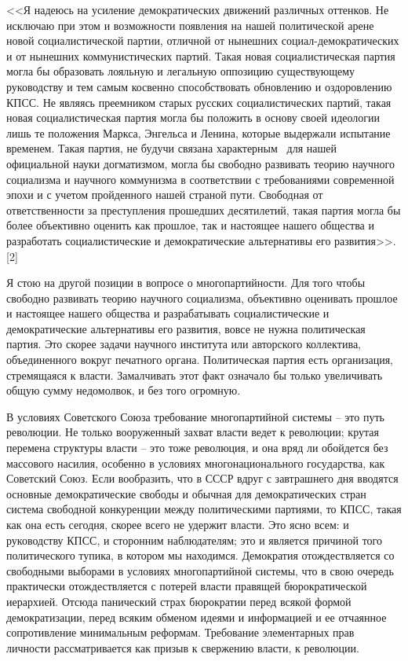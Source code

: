 \documentclass{book}
\begin{document}
<<Я надеюсь на усиление демократических движений различ­ных оттенков. Не исключаю при этом и возможности появле­ния на нашей политической арене новой социалистической пар­тии, отличной от нынешних социал-демократических и от нынеш­них коммунистических партий. Такая новая социалистическая партия могла бы образовать лояльную и легальную оппозицию существующему руководству и тем самым косвенно способ­ствовать обновлению и оздоровлению КПСС. Не являясь преем­ником старых русских социалистических партий, такая новая социалистическая партия могла бы положить в основу своей идеологии лишь те положения Маркса, Энгельса и Ленина, ко­торые выдержали испытание временем. Такая партия, не бу­дучи связана характерным  для нашей официальной науки догматизмом, могла бы свободно развивать теорию научного социализма и научного коммунизма в соответствии с требова­ниями современной эпохи и с учетом пройденного нашей стра­ной пути. Свободная от ответственности за преступления про­шедших десятилетий, такая партия могла бы более 
объектив­но оценить как прошлое, так и настоящее нашего общества и разработать социалистические и демократические альтернативы его развития>>. [2]

Я стою на другой позиции в вопросе о многопартийности. Для того чтобы свободно развивать теорию научного социализ­ма, объективно оценивать прошлое и настоящее нашего общест­ва и разрабатывать социалистические и демократические альтер­нативы его развития, вовсе не нужна политическая партия. Это скорее задачи научного института или авторского коллек­тива, объединенного вокруг печатного органа. Политическая партия есть организация, стремящаяся к власти. Замалчивать этот факт означало бы только увеличивать общую сумму не­домолвок, и без того огромную.

В условиях Советского Союза требование многопартийной системы -- это путь революции. Не только вооруженный захват власти ведет к революции; крутая перемена структуры вла­сти -- это тоже революция, и она вряд ли обойдется без массо­вого насилия, особенно в условиях многонационального госу­дарства, как Советский Союз. Если вообразить, что в СССР вдруг с завтрашнего дня вводятся основные демократические свободы и обычная для демократических стран система сво­бодной конкуренции между политическими партиями, то КПСС, такая как она есть сегодня, скорее всего не удержит власти. Это ясно всем: и руководству КПСС, и сторонним наблюдате­лям; это и является причиной того политического тупика, в котором мы находимся. Демократия отождествляется со сво­бодными выборами в условиях многопартийной системы, что в свою очередь практически отождествляется с потерей влас­ти правящей бюрократической иерархией. Отсюда панический страх бюрократии перед всякой формой демократизации, перед всяким обменом идеями и информацией и ее 
отчаянное сопро­тивление минимальным реформам. Требование элементарных прав личности рассматривается как призыв к свержению вла­сти, к революции.
\end{document}
